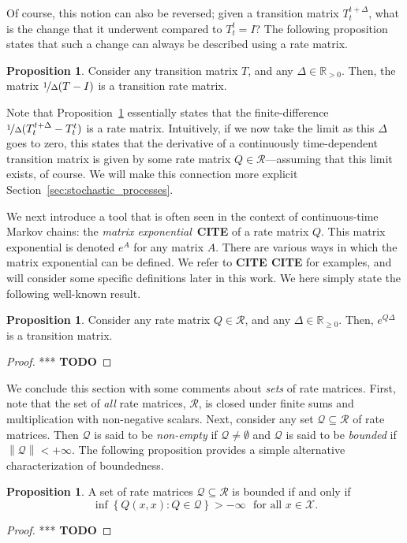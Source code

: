 \documentclass[10pt,a4paper]{paper}
\theoremstyle{definition}
\newtheorem{proposition}[theorem]{Proposition}
\newcommand{\reals}{\mathbb{R}}
\newcommand{\realspos}{\reals_{>0}}
\newcommand{\realsnonneg}{\reals_{\geq 0}}
\newcommand{\states}{\mathcal{X}}
\newcommand{\rateset}{\mathcal{Q}}
\newcommand{\norm}[1]{\left\lVert #1 \right\rVert}
\begin{document}
Of course, this notion can also be reversed; given a transition matrix $T_t^{t+\Delta}$, what is the change that it underwent compared to $T_t^t=I$? The following proposition states that such a change can always be described using a rate matrix.
\begin{proposition}\label{prop:rate_from_stochastic_matrix}
Consider any transition matrix $T$, and any $\Delta\in\realspos$. Then, the matrix $\nicefrac{1}{\Delta}(T-I)$ is a transition rate matrix.
\end{proposition}
Note that Proposition~\ref{prop:rate_from_stochastic_matrix} essentially states that the finite-difference $\nicefrac{1}{\Delta}(T_t^{t+\Delta} - T_t^t)$ is a rate matrix. Intuitively, if we now take the limit as this $\Delta$ goes to zero, this states that the derivative of a continuously time-dependent transition matrix is given by some rate matrix $Q\in\mathcal{R}$---assuming that this limit exists, of course. We will make this connection more explicit Section~\ref{sec:stochastic_processes}.

We next introduce a tool that is often seen in the context of continuous-time Markov chains: the \emph{matrix exponential}~{\bf CITE} of a rate matrix $Q$. This matrix exponential is denoted $e^A$ for any matrix $A$. There are various ways in which the matrix exponential can be defined. We refer to {\bf CITE CITE} for examples, and will consider some specific definitions later in this work.
We here simply state the following well-known result.
\begin{proposition}\label{prop:stochastic_from_exponential}
Consider any rate matrix $Q\in\mathcal{R}$, and any $\Delta\in\realsnonneg$. Then, $e^{Q\Delta}$ is a transition matrix.
\end{proposition}
\begin{proof}
*** {\bf TODO}
\end{proof}

We conclude this section with some comments about \emph{sets} of rate matrices. First, note that the set of \emph{all} rate matrices, $\mathcal{R}$, is closed under finite sums and multiplication with non-negative scalars. Next, consider any set $\rateset\subseteq\mathcal{R}$ of rate matrices. Then $\rateset$ is said to be \emph{non-empty} if $\rateset\neq\emptyset$ and $\rateset$ is said to be \emph{bounded} if $\norm{\rateset}<+\infty$. The following proposition provides a simple alternative characterization of boundedness.

\begin{proposition}\label{prop:alternativedefforbounded}
A set of rate matrices $\rateset\subseteq\mathcal{R}$ is bounded if and only if
\begin{equation*}
\inf\left\{Q(x,x)\colon Q\in\rateset\right\}>-\infty\text{~~for all $x\in\states$.}
\end{equation*}
\end{proposition}
\begin{proof}
*** {\bf TODO}
\end{proof}
\end{document}
